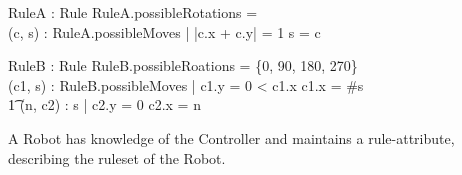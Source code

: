 \documentclass[12pt]{article}
\begin{document}
\begin{axdef}
RuleA : Rule
\where
RuleA.possibleRotations = \emptyset \\
\forall (c, s) : RuleA.possibleMoves | |c.x + c.y| = 1 \wedge s = \langle c\rangle
\end{axdef}

\begin{axdef}
RuleB : Rule
\where
RuleB.possibleRoations = \{0, 90, 180, 270\} \\
\forall (c1, s) : RuleB.possibleMoves | c1.y = 0  < c1.x  \wedge c1.x = \#s \; \; \wedge \\ \t1 \forall (n, c2) : s | c2.y = 0 \wedge c2.x = n
\end{axdef}

A Robot has knowledge of the Controller and maintains a rule-attribute, describing the ruleset of the Robot.
\end{document}
